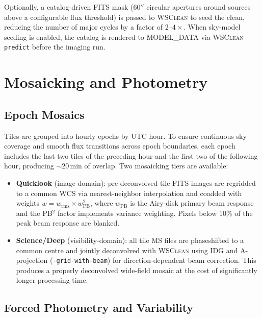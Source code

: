 \documentclass[twocolumn,11pt]{article}
\newcommand{\wsclean}{\textsc{WSClean}\xspace}
\begin{document}
Optionally, a catalog-driven FITS mask (60$''$ circular apertures around
sources above a configurable flux threshold) is passed to \wsclean to
seed the clean, reducing the number of major cycles by a factor of
$2$--$4\times$.  When sky-model seeding is enabled, the catalog is
rendered to MODEL\_DATA via \wsclean \texttt{-predict} before the
imaging run.


\section{Mosaicking and Photometry}\label{sec:mosaic}

\subsection{Epoch Mosaics}\label{sec:epoch_mosaic}

Tiles are grouped into hourly epochs by UTC hour.  To ensure continuous
sky coverage and smooth flux transitions across epoch boundaries, each
epoch includes the last two tiles of the preceding hour and the first
two of the following hour, producing $\sim\!20$\,min of overlap.  Two
mosaicking tiers are available:

\begin{itemize}
  \item \textbf{Quicklook} (image-domain): pre-deconvolved tile FITS
  images are regridded to a common WCS via nearest-neighbor
  interpolation and coadded with weights
  $w = w_{\mathrm{rms}} \times w_{\mathrm{PB}}^{2}$,
  where $w_{\mathrm{PB}}$ is the Airy-disk primary beam response and
  the PB$^{2}$ factor implements variance weighting.
  Pixels below 10\% of the peak beam response are blanked.

  \item \textbf{Science/Deep} (visibility-domain): all tile MS files are
  phaseshifted to a common centre and jointly deconvolved with \wsclean
  using IDG and A-projection (\texttt{-grid-with-beam}) for
  direction-dependent beam correction.  This produces a properly
  deconvolved wide-field mosaic at the cost of significantly longer
  processing time.
\end{itemize}

\subsection{Forced Photometry and Variability}\label{sec:photometry}
\end{document}
